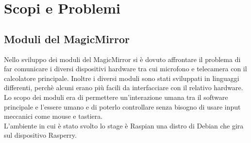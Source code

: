 \chapter{Scopi e Problemi}

\section{Moduli del MagicMirror}
Nello sviluppo dei moduli del MagicMirror si è dovuto affrontare il problema di far comunicare
i diversi dispositivi hardware tra cui microfono e telecamera con il calcolatore principale.
Inoltre i diversi moduli sono stati sviluppati in linguaggi differenti, perchè alcuni
erano più facili da interfacciare con il relativo hardware.\\
Lo scopo dei moduli era di permettere un'interazione umana tra il software principale
e l'essere umano e di poterlo controllare senza bisogno di usare input meccanici come mouse e tastiera.\\
L'ambiente in cui è stato svolto lo stage è Raspian una distro di Debian che gira
sul dispositivo Rasperry.
